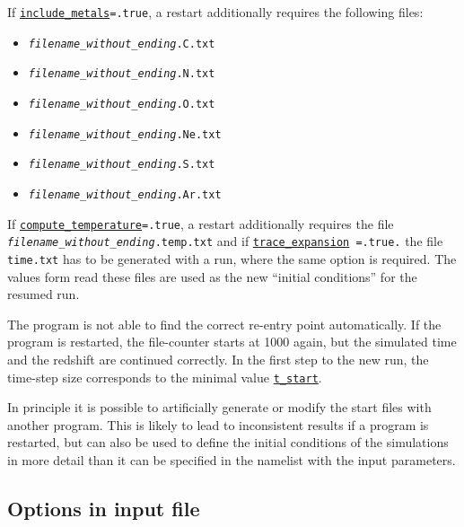 \documentclass[a4paper,10pt]{article}
\begin{document}
\begin{itemize}
If \texttt{\hyperref[opt:includemetals]{include\_metals}=.true}, a restart  
additionally requires the following files:
\begin{itemize}
\item \texttt{\textit{filename\_without\_ending}.C.txt}
\item \texttt{\textit{filename\_without\_ending}.N.txt}
\item \texttt{\textit{filename\_without\_ending}.O.txt}
\item \texttt{\textit{filename\_without\_ending}.Ne.txt}
\item \texttt{\textit{filename\_without\_ending}.S.txt}
\item \texttt{\textit{filename\_without\_ending}.Ar.txt}
\end{itemize}

If \texttt{\hyperref[opt:computetemperature]{compute\_temperature}=.true},  a 
restart additionally requires the file 
\texttt{\textit{filename\_\-without\_\-ending}.temp.txt} and if 
\texttt{\hyperref[opt:traceexpansion]{trace\_expansion} =.true.} the file 
\texttt{time.txt} has to be generated with a run, where the same option is 
required. The values form read these files are used as the new ``initial 
conditions'' for the resumed run. 

The program is not able to find the correct re-entry point automatically.  If 
the program is restarted, the file-counter starts at 1000 again, but the 
simulated time and the redshift are continued correctly. In the first step to 
the new run, the time-step size corresponds to the 
minimal value \texttt{\hyperref[opt:tstart]{t\_start}}.

In principle it is possible to artificially generate or modify the start files  
with another program. This is  likely to lead to inconsistent results if a 
program is restarted, but can also be used to define the initial conditions of 
the simulations in more detail than it can be specified in the 
namelist with the input parameters.

\end{itemize}
\subsection{Options in input file}
\label{sec:inputfile}
\end{document}
